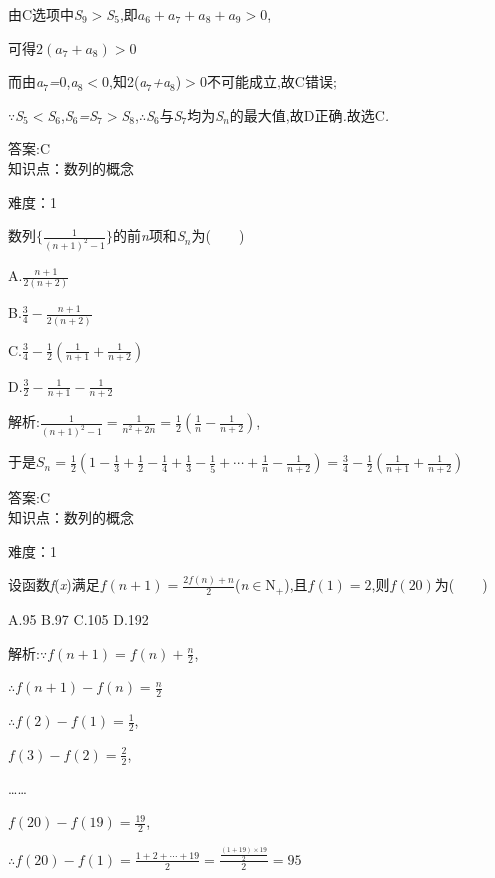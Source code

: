 \documentclass{article} %
\begin{document}
由C选项中\textit{S}${}_{9}$\textit{$>$S}${}_{5}$,即$a_6+a_7+a_8+a_9>0$,

可得$2(a_7+a_8)>0$

而由\textit{a}${}_{7}$\textit{=}0,\textit{a}${}_{8}$\textit{$<$}0,知2(\textit{a}${}_{7}$\textit{+a}${}_{8}$)\textit{$>$}0不可能成立,故C错误;

\textit{$\because$S}${}_{5}$\textit{$<$S}${}_{6}$,\textit{S}${}_{6}$\textit{=S}${}_{7}$\textit{$>$S}${}_{8}$,\textit{$\therefore$S}${}_{6}$与\textit{S}${}_{7}$均为\textit{S${}_{n}$}的最大值,故D正确\textit{.}故选C\textit{.}

 答案:C \\

知识点：数列的概念

难度：1

 数列$\{\frac{1}{(n+1)^2-1}\}$的前\textit{n}项和\textit{S${}_{n}$}为(\textit{　　})

 A.$\frac{n+1}{2(n+2)}$

 B.$\frac{3}{4}-\frac{n+1}{2(n+2)}$

 C.$\frac{3}{4}-\frac{1}{2}(\frac{1}{n+1}+\frac{1}{n+2})$

 D.$\frac{3}{2}-\frac{1}{n+1}-\frac{1}{n+2}$

 解析:$\frac{1}{(n+1)^2-1}=\frac{1}{n^2+2n}=\frac{1}{2}(\frac{1}{n}-\frac{1}{n+2})$,

于是$S_n=\frac{1}{2}(1-\frac{1}{3}+\frac{1}{2}-\frac{1}{4}+\frac{1}{3}-\frac{1}{5}+\cdots +\frac{1}{n}-\frac{1}{n+2})=\frac{3}{4}-\frac{1}{2}(\frac{1}{n+1}+\frac{1}{n+2})$

 答案:C \\


知识点：数列的概念

难度：1

 设函数\textit{f}(\textit{x})满足$f(n+1)=\frac{2f(n)+n}{2}$(\textit{n}$\mathrm{\in}$N\textit{${}_{+}$}),且$f(1)=2$,则$f(20)$为(\textit{　　})

 A.95 B.97 C.105 D.192

 解析:$\because f(n+1)=f(n)+\frac{n}{2}$,

$\therefore f(n+1)-f(n)=\frac{n}{2}$

$\therefore f(2)-f(1)=\frac{1}{2}$,

$f(3)-f(2)=\frac{2}{2}$,

{\dots}{\dots}

$f(20)-f(19)=\frac{19}{2}$,

$\therefore f(20)-f(1)=\frac{1+2+\cdots +19}{2}=\frac{\frac{(1+19)\times 19}{2}}{2}=95$
\end{document}
